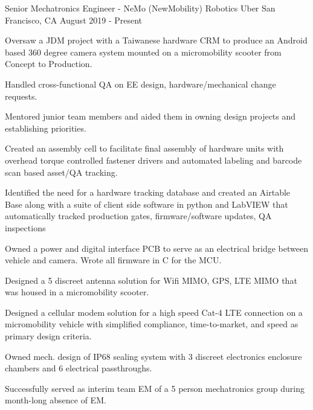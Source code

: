 

\begin{cventries}

  \cventry
    {Senior Mechatronics Engineer - NeMo (NewMobility) Robotics} %
    {Uber} %
    {San Francisco, CA} %
    {August 2019 - Present} %
    {
      \begin{cvitems} %
        \item {Oversaw a JDM project with a Taiwanese hardware CRM to produce an Android based 360 degree camera system mounted on a micromobility scooter from Concept to Production.}
        \item {Handled cross-functional QA on EE design, hardware/mechanical change requests.}
        \item {Mentored junior team members and aided them in owning design projects and establishing priorities.}
        \item {Created an assembly cell to facilitate final assembly of hardware units with overhead torque controlled fastener drivers and automated labeling and barcode scan based asset/QA tracking.}
        \item {Identified the need for a hardware tracking database and created an Airtable Base along with a suite of client side software in python and LabVIEW that automatically tracked production gates, firmware/software updates, QA inspections } 
        \item {Owned a power and digital interface PCB to serve as an electrical bridge between vehicle and camera. Wrote all firmware in C for the MCU.} 
        \item {Designed a 5 discreet antenna solution for Wifi MIMO, GPS, LTE MIMO that was housed in a micromobility scooter.}
        \item {Designed a cellular modem solution for a high speed Cat-4 LTE connection on a micromobility vehicle with simplified compliance, time-to-market, and speed as primary design criteria.}
        \item {Owned mech. design of IP68 sealing system with 3 discreet electronics enclosure chambers and 6 electrical passthroughs.}
        \item {Successfully served as interim team EM of a 5 person mechatronics group during month-long absence of EM.}
      \end{cvitems}
    }


\end{cventries}
